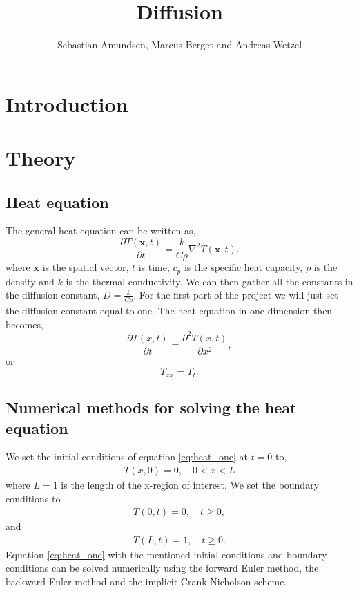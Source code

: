\documentclass{article}
\begin{document}
\title{Diffusion}
\author{Sebastian Amundsen, Marcus Berget and Andreas Wetzel}

\maketitle

\begin{abstract}

\end{abstract}

\begin{multicols}{2}

\section{Introduction}



\section{Theory}

\subsection{Heat equation}

The general heat equation can be written as,
\begin{equation}
	\frac{\partial T(\textbf{x}, t)}{\partial t} = \frac{k}{C\rho}\nabla^2 T(\textbf{x}, t). \label{eq:gen_heat}
\end{equation}
where $\textbf{x}$ is the spatial vector, $t$ is time, $c_p$ is the specific heat capacity, $\rho$ is the density and $k$ is the thermal conductivity. We can then gather all the constants in the diffusion constant, $D=\frac{k}{C\rho}$. For the first part of the project we will just set the diffusion constant equal to one. The heat equation in one dimension then becomes, 
\begin{equation}
	\frac{\partial T(x,t)}{\partial t} = \frac{\partial^2 T(x,t)}{\partial x^2}, \label{eq:heat_one}
\end{equation}
or 
\begin{equation}
	T_{xx}=T_t.
\end{equation}
\subsection{Numerical methods for solving the heat equation}
We set the initial conditions of equation \eqref{eq:heat_one} at $t=0$ to,
\begin{align}
	T(x,0)=0, \quad 0<x<L
\end{align}
where $L=1$ is the length of the x-region of interest. We set the boundary conditions to
\begin{align}
	T(0, t)=0, \quad t\geq 0,
\end{align}
and
\begin{align}
	T(L, t)= 1, \quad t\geq 0.
\end{align}
Equation \eqref{eq:heat_one} with the mentioned initial conditions and boundary conditions can be solved numerically using the forward Euler method, the backward Euler method and the implicit Crank-Nicholson scheme. 



\end{multicols}
\end{document}
